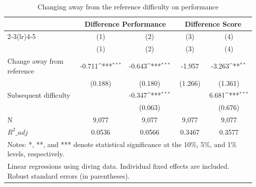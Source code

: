 \begin{table}[htbp]\centering
\def\sym#1{\ifmmode^{#1}\else\(^{#1}\)\fi}
\caption{Changing away from the reference difficulty on performance}
\begin{tabular}{l*{4}{c}}
\toprule
                    &\multicolumn{2}{c}{Difference Performance} &\multicolumn{2}{c}{Difference Score}       \\\cmidrule(lr){2-3}\cmidrule(lr){4-5}
                    &\multicolumn{1}{c}{(1)}&\multicolumn{1}{c}{(2)}&\multicolumn{1}{c}{(3)}&\multicolumn{1}{c}{(4)}\\
                    &\multicolumn{1}{c}{(1)}&\multicolumn{1}{c}{(2)}&\multicolumn{1}{c}{(3)}&\multicolumn{1}{c}{(4)}\\
\midrule
Change away from reference&      -0.711\sym{***}&      -0.643\sym{***}&      -1.957         &      -3.263\sym{**} \\
                    &     (0.188)         &     (0.180)         &     (1.266)         &     (1.361)         \\
\addlinespace
Subsequent difficulty&                     &      -0.347\sym{***}&                     &       6.681\sym{***}\\
                    &                     &     (0.063)         &                     &     (0.676)         \\
\midrule
N                   &       9,077         &       9,077         &       9,077         &       9,077         \\
\(R^2\_{adj}\)       &      0.0536         &      0.0566         &      0.3467         &      0.3577         \\
\bottomrule
\multicolumn{5}{l}{\footnotesize Notes: *, **, and *** denote statistical significance at the 10\%, 5\%, and 1\% levels, respectively.}\\
\multicolumn{5}{l}{\footnotesize Linear regressions using diving data. Individual fixed effects are included. Robust standard errors (in parentheses).}\\
\end{tabular}
\end{table}
